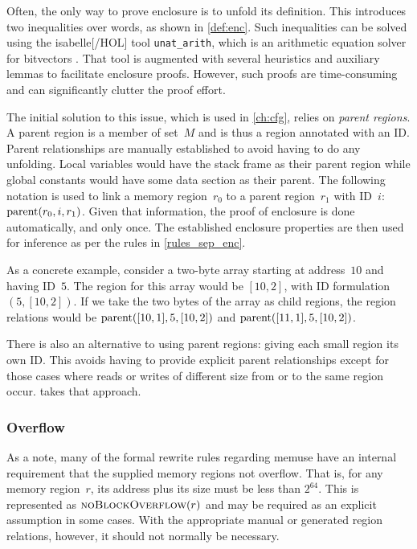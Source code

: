 Often, the only way to prove enclosure is to unfold its definition.
This introduces two inequalities over words, as shown in \cref{def:enc}.
Such inequalities can be solved using the \gls{isabelle}[/HOL] tool \lstinline{unat_arith}, which is an arithmetic equation solver for bitvectors \autocite{dawson2009isabelle,isabelle-word-session}.
That tool is augmented with several heuristics
and auxiliary lemmas to facilitate enclosure proofs.
However, such proofs are time-consuming
and can significantly clutter the proof effort.

The initial solution to this issue, which is used in \cref{ch:cfg},
relies on \emph{parent regions}.%
A parent region is a member of set~$M$ and is thus a region annotated with an ID.
Parent relationships are manually established to avoid having to do any unfolding.
Local variables would have the stack frame as their parent region
while global constants would have some data section as their parent.
The following notation is used to link a memory region~$r_0$
to a parent region~$r_1$ with ID~$i$: $\operatorname{parent}(r_0,i,r_1)$.
Given that information, the proof of enclosure is done automatically, and only once.
The established enclosure properties are then used for inference
as per the rules in \cref{rules_sep_enc}.

As a concrete example, consider a two-byte array starting at address~$10$
and having ID~$5$.
The region for this array would be $[10, 2]$, with ID formulation $(5, [10, 2])$.
If we take the two bytes of the array as child regions,
the region relations would be $\operatorname{parent}([10, 1],5,[10, 2])$
and $\operatorname{parent}([11, 1],5,[10, 2])$.

There is also an alternative to using parent regions:
giving each small region its own ID.
This avoids having to provide explicit parent relationships
except for those cases where reads or writes of different size
from or to the same region occur.  takes that approach.

\subsubsection{Overflow}
As a note, many of the formal rewrite rules regarding \gls{memuse}
have an internal requirement that the supplied memory regions not overflow.
That is, for any memory region~$r$,
its address plus its size must be less than $2^{64}$.
This is represented as $\operatorname{\textsc{noBlockOverflow}}(r)$ and may be required as an explicit assumption
in some cases. With the appropriate manual or generated region relations,
however, it should not normally be necessary.

